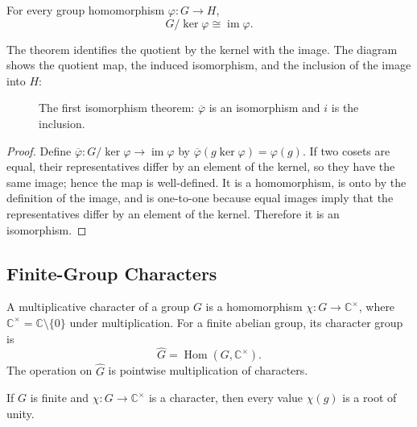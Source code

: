 \begin{theorem}
For every group homomorphism $\varphi:G\to H$,
\[
 G/\ker\varphi\cong\operatorname{im}\varphi.
\]
\end{theorem}

The theorem identifies the quotient by the kernel with the image. The diagram shows the quotient map, the induced isomorphism, and the inclusion of the image into $H$:

\begin{figure}[H]
\centering
{}
\caption{The first isomorphism theorem: $\overline{\varphi}$ is an isomorphism and $i$ is the inclusion.}
\label{fig:first-isomorphism}
\end{figure}

\begin{proof}
Define $\overline{\varphi}:G/\ker\varphi\to\operatorname{im}\varphi$ by $\overline{\varphi}(g\ker\varphi)=\varphi(g)$. If two cosets are equal, their representatives differ by an element of the kernel, so they have the same image; hence the map is well-defined. It is a homomorphism, is onto by the definition of the image, and is one-to-one because equal images imply that the representatives differ by an element of the kernel. Therefore it is an isomorphism.
\end{proof}

\subsection{Finite-Group Characters}

\begin{definition}
A multiplicative character of a group $G$ is a homomorphism $\chi:G\to\mathbb{C}^{\times}$, where $\mathbb{C}^{\times}=\mathbb{C}\setminus\{0\}$ under multiplication. For a finite abelian group, its character group is
\[
 \widehat{G}=\operatorname{Hom}(G,\mathbb{C}^{\times}).
\]
The operation on $\widehat{G}$ is pointwise multiplication of characters.
\end{definition}

\begin{proposition}
If $G$ is finite and $\chi:G\to\mathbb{C}^{\times}$ is a character, then every value $\chi(g)$ is a root of unity.
\end{proposition}

